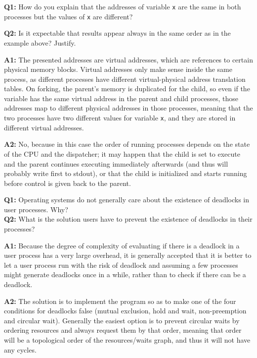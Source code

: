 \documentclass{sope}
\begin{document}
\textbf{Q1:} How do you explain that the addresses of variable \texttt{x} are the same in both processes but the values of \texttt{x} are different?

\textbf{Q2:} Is it expectable that results appear always in the same order as in the example above? Justify.

\ansseparator

\textbf{A1:} The presented addresses are virtual addresses, which are references to certain physical memory blocks. Virtual addresses only make sense inside the same process, as different processes have different virtual-physical address translation tables. On forking, the parent's memory is duplicated for the child, so even if the variable has the same virtual address in the parent and child processes, those addresses map to different physical addresses in those processes, meaning that the two processes have two different values for variable \texttt{x}, and they are stored in different virtual addresses.

\textbf{A2:} No, because in this case the order of running processes depends on the state of the CPU and the dispatcher; it may happen that the child is set to execute and the parent continues executing immediately afterwards (and thus will probably write first to stdout), or that the child is initialized and starts running before control is given back to the parent.


\textbf{Q1:} Operating systems do not generally care about the existence of deadlocks in user processes. Why? \\
\textbf{Q2:} What is the solution users have to prevent the existence of deadlocks in their processes?

\ansseparator

\textbf{A1:} Because the degree of complexity of evaluating if there is a deadlock in a user process has a very large overhead, it is generally accepted that it is better to let a user process run with the risk of deadlock and assuming a few processes might generate deadlocks once in a while, rather than to check if there can be a deadlock.

\textbf{A2:} The solution is to implement the program so as to make one of the four conditions for deadlocks false (mutual exclusion, hold and wait, non-preemption and circular wait). Generally the easiest option is to prevent circular waits by ordering resources and always request them by that order, meaning that order will be a topological order of the resources/waits graph, and thus it will not have any cycles.
\end{document}
